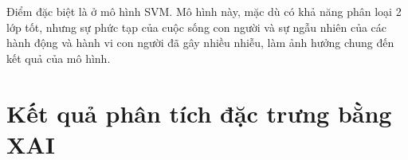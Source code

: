 Điểm đặc biệt là ở mô hình SVM. Mô hình này, mặc dù có khả năng phân loại 2 lớp tốt, nhưng sự phức tạp của cuộc sống con người và sự ngẫu nhiên của các hành động và hành vi con người đã gây nhiều nhiễu, làm ảnh hưởng chung đến kết quả của mô hình. 

\section{Kết quả phân tích đặc trưng bằng XAI}\label{XAI_analytics}
\begin{figure}[!ht]
\end{figure}

